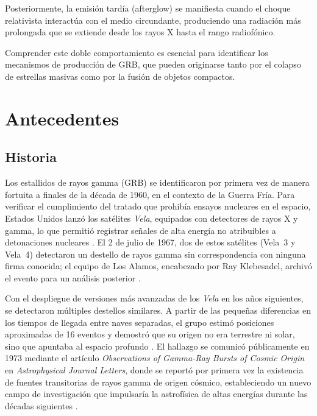 \documentclass[final,5p,times,twocolumn,authoryear]{elsarticle}
\begin{document}
Posteriormente, la emisión tardía (afterglow) se manifiesta cuando el choque relativista interactúa con el medio circundante, produciendo una radiación más prolongada que se extiende desde los rayos X hasta el rango radiofónico.

Comprender este doble comportamiento es esencial para identificar los
mecanismos de producción de GRB, que pueden originarse tanto por el
colapso de estrellas masivas como por la fusión de objetos compactos.

\section{Antecedentes}
\label{antecedentes}
% 

\subsection{Historia}

Los estallidos de rayos gamma (GRB) se identificaron por primera vez de manera fortuita a finales de la década de 1960, en el contexto de la Guerra Fría. Para verificar el cumplimiento del tratado que prohibía ensayos nucleares en el espacio, Estados Unidos lanzó los satélites \textit{Vela}, equipados con detectores de rayos X y gamma, lo que permitió registrar señales de alta energía no atribuibles a detonaciones nucleares \citep{bonnell1995}. El 2 de julio de 1967, dos de estos satélites (Vela~3 y Vela~4) detectaron un destello de rayos gamma sin correspondencia con ninguna firma conocida; el equipo de Los Alamos, encabezado por Ray Klebesadel, archivó el evento para un análisis posterior \citep{bonnell1995}.

Con el despliegue de versiones más avanzadas de los \textit{Vela} en los años siguientes, se detectaron múltiples destellos similares. A partir de las pequeñas diferencias en los tiempos de llegada entre naves separadas, el grupo estimó posiciones aproximadas de 16 eventos y demostró que su origen no era terrestre ni solar, sino que apuntaba al espacio profundo \citep{bonnell1995,klebesadel1973}. El hallazgo se comunicó públicamente en 1973 mediante el artículo \textit{Observations of Gamma-Ray Bursts of Cosmic Origin} en \textit{Astrophysical Journal Letters}, donde se reportó por primera vez la existencia de fuentes transitorias de rayos gamma de origen cósmico, estableciendo un nuevo campo de investigación que impulsaría la astrofísica de altas energías durante las décadas siguientes \citep{klebesadel1973}.
\end{document}
